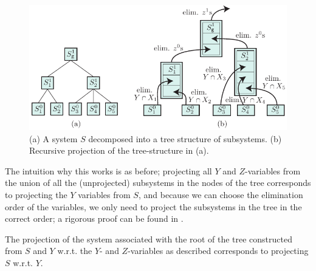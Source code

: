 \begin{figure}
	\centering
		\includegraphics{figures/recursiveProjectionEs(b).pdf}
	\caption{(a) A system $S$ decomposed into a tree structure of subsystems. (b) Recursive projection of the tree-structure in (a).}
	\label{fig:decomp2}
\end{figure}

The intuition why this works is as before; projecting all $Y$ and $Z$-variables from the union of all the (unprojected) subsystems in the nodes of the tree corresponds to projecting the $Y$ variables from $S$, and because we can choose the elimination order of the variables, we only need to project the subsystems in the tree in the correct order; a rigorous proof can be found in \cite{MyTechRep}.

\begin{prop}
The projection of the system associated with the root of the tree constructed from $S$ and $Y$ w.r.t. the $Y$- and $Z$-variables as described corresponds to projecting $S$ w.r.t. $Y$.
\end{prop}

